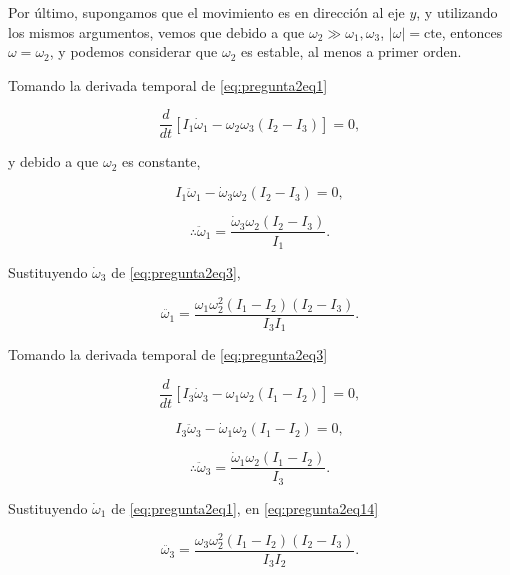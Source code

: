 \documentclass[a4paper,10pt]{article}
\numberwithin{equation}{section}
\begin{document}
\vspace{.3cm}

Por último, supongamos que el movimiento es en dirección al eje $y$,  y utilizando los 
mismos argumentos, vemos que debido a que $\omega_2 \gg \omega_1,\omega_3$, 
$|\omega| = \text{cte}$, entonces $\omega = \omega_2$, y podemos considerar 
que $\omega_2$ es estable, al menos a primer orden. 

Tomando la derivada temporal de \eqref{eq:pregunta2eq1} 

\begin{equation}
 \frac{d}{dt}\left[I_1\dot{\omega}_1 - \omega_2\omega_3(I_2 - I_3) \right] = 0,
\end{equation}

y debido a que $\omega_2$ es constante, 

\begin{equation}
 I_1\ddot{\omega}_1 - \dot{\omega}_3\omega_2(I_2 - I_3) = 0,
\end{equation}

\begin{equation}
 \therefore \ddot{\omega}_1 = \frac{\dot{\omega}_3\omega_2(I_2-I_3)}{I_1}.
  \label{eq:pregunta2eq12}
\end{equation}

Sustituyendo $\dot{\omega}_3$ de \eqref{eq:pregunta2eq3}, 

\begin{equation}
 \ddot{\omega_1} = \frac{\omega_1\omega_2^2(I_1 - I_2)(I_2 - I_3)}{I_3I_1}.
 \label{eq:pregunta2eq13}
\end{equation}

Tomando la derivada temporal de \eqref{eq:pregunta2eq3} 

\begin{equation}
 \frac{d}{dt}\left[I_3\dot{\omega}_3 - \omega_1\omega_2(I_1 - I_2) \right] = 0,
\end{equation}

\begin{equation}
 I_3\ddot{\omega}_3 - \dot{\omega}_1\omega_2(I_1 - I_2) = 0,
\end{equation}

\begin{equation}
 \therefore \ddot{\omega}_3 = \frac{\dot{\omega}_1\omega_2(I_1-I_2)}{I_3}.
 \label{eq:pregunta2eq14}
\end{equation}

Sustituyendo $\dot{\omega}_1$ de \eqref{eq:pregunta2eq1}, en \eqref{eq:pregunta2eq14}

\begin{equation}
 \ddot{\omega_3} = \frac{\omega_3\omega_2^2(I_1 - I_2)(I_2- I_3)}{I_3I_2}.
 \label{eq:pregunta2eq15}
\end{equation}
\end{document}
